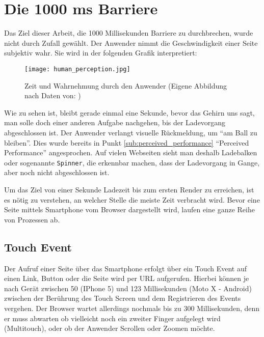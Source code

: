 
\pagebreak
%
%


\section{Die 1000 ms Barriere} %
\label{sec:die_1000_ms_barriere}
	Das Ziel dieser Arbeit, die 1000 Millisekunden Barriere zu durchbrechen, wurde nicht durch Zufall gewählt. Der Anwender nimmt die Geschwindigkeit einer Seite subjektiv wahr. Sie wird in der folgenden Grafik interpretiert:

	\begin{figure}[htbp]
		\begin{center}
			\texttt{[image: human\_perception.jpg]}
			\caption{Zeit und Wahrnehmung durch den Anwender (Eigene Abbildung nach Daten von: \autocite{grigorikHumanPerception})}
			\label{fig:human_perception}
		\end{center}
	\end{figure}

	Wie zu sehen ist, bleibt gerade einmal eine Sekunde, bevor das Gehirn uns sagt, man solle doch einer anderen Aufgabe nachgehen, bis der Ladevorgang abgeschlossen ist. Der Anwender verlangt visuelle Rückmeldung, um "`am Ball zu bleiben"'. Dies wurde bereits in Punkt \ref{sub:perceived_performance} "`Perceived Performance"' angesprochen. Auf vielen Webseiten sieht man deshalb Ladebalken oder sogenannte \texttt{Spinner}, die erkennbar machen, dass der Ladevorgang in Gange, aber noch nicht abgeschlossen ist.

	Um das Ziel von einer Sekunde Ladezeit bis zum ersten Render zu erreichen, ist es nötig zu verstehen, an welcher Stelle die meiste Zeit verbracht wird. Bevor eine Seite mittels Smartphone vom Browser dargestellt wird, laufen eine ganze Reihe von Prozessen ab.



	\subsection{Touch Event} %
	\label{sub:touch_event}
		Der Aufruf einer Seite über das Smartphone erfolgt über ein Touch Event auf einen Link, Button oder die Seite wird per URL aufgerufen. Hierbei können je nach Gerät zwischen 50 (IPhone 5) und 123 Millisekunden (Moto X - Android) zwischen der Berührung des Touch Screen und dem Registrieren des Events vergehen.\autocite{venturebeat} Der Browser wartet allerdings nochmals bis zu 300 Millisekunden, denn er muss abwarten ob vielleicht noch ein zweiter Finger aufgelegt wird (Multitouch), oder ob der Anwender Scrollen oder Zoomen möchte.\autocite{google11}

